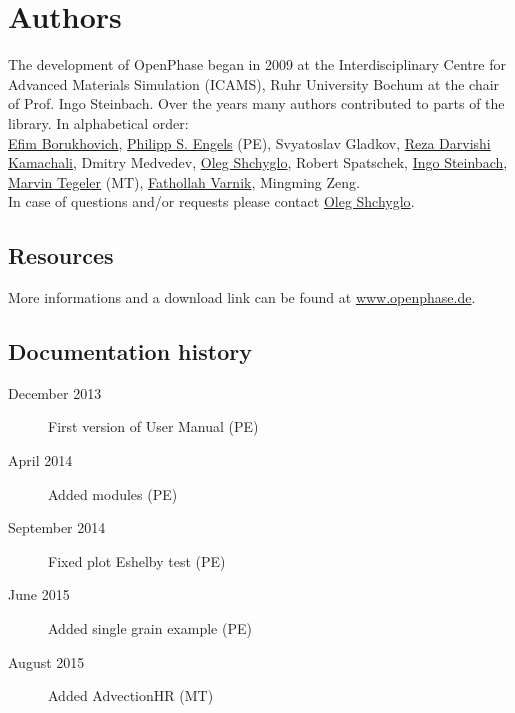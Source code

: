 \chapter*{Authors}
The development of OpenPhase began in 2009 at the Interdisciplinary Centre for Advanced Materials Simulation (ICAMS), Ruhr University Bochum at the chair of Prof. Ingo Steinbach. Over the years many authors contributed to parts of the library. In alphabetical order:\\

\href{mailto:efim.borukhovich@rub.de}{Efim Borukhovich}, \href{mailto:philipp.s.engels@rub.de}{Philipp S. Engels} (PE), Svyatoslav Gladkov, \href{mailto:reza.darvishi@rub.de}{Reza Darvishi Kamachali}, Dmitry Medvedev, \href{mailto:oleg.shchyglo@rub.de}{Oleg Shchyglo}, Robert Spatschek, \href{mailto:ingo.steinbach@rub.de}{Ingo Steinbach}, \href{mailto:marvin.tegeler@rub.de}{Marvin Tegeler} (MT), \href{mailto:fathollah.varnik@rub.de}{Fathollah Varnik}, Mingming Zeng.\\

In case of questions and/or requests please contact \href{mailto:oleg.shchyglo@rub.de}{Oleg Shchyglo}.
\section*{Resources}
More informations and a download link can be found at \href{http://www.openpase.de}{www.openphase.de}.

\section*{Documentation history}
\begin{description}
\item[December 2013] First version of User Manual (PE)
\item[April 2014] Added modules (PE)
\item[September 2014] Fixed plot Eshelby test (PE)
\item[June 2015] Added single grain example (PE)
\item[August 2015] Added AdvectionHR (MT)
\end{description}

